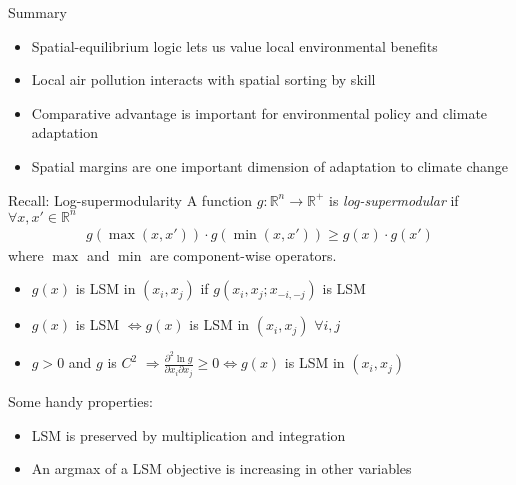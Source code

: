 \documentclass[11pt,notes=hide,aspectratio=169]{beamer}
\begin{document}
\begin{frame}{Summary}
\begin{itemize}
\item Spatial-equilibrium logic lets us value local environmental benefits
\item Local air pollution interacts with spatial sorting by skill
\item Comparative advantage is important for environmental policy and climate adaptation
\item Spatial margins are one important dimension of adaptation to climate change 
\end{itemize}
\vspace{1cm}
\end{frame}
\appendix
\begin{frame}{Recall: Log-supermodularity}
\hypertarget{appendix:LSM}{}
A function $g:\mathbb{R}^n\to\mathbb{R}^{+}$ is \emph{log-supermodular} if $\forall x,x'\in\mathbb{R}^n$
\begin{align*}
g\left(\max\left(x,x'\right)\right)\cdot g\left(\min\left(x,x'\right)\right)\geq g(x)\cdot g(x')
\end{align*}
where $\max$ and $\min$ are component-wise operators.
\begin{itemize}
	\item $g(x)$ is LSM in $(x_i,x_j)$ if $g(x_i,x_j;x_{-i,-j})$ is LSM 
	\item $g(x)$ is LSM $\iff g(x)$ is LSM in $(x_i,x_j)$  $\forall i,j$
	\item $g>0$ and $g$ is $C^2$ $\Rightarrow \frac{\partial^2 \ln g}{\partial x_i \partial x_j}\geq 0 \iff g(x)$ is LSM in $(x_i,x_j)$
\end{itemize}
Some handy properties:
\begin{itemize}
	\item LSM is preserved by multiplication and integration
	\item An argmax of a LSM objective is increasing in other variables
\end{itemize}
\hyperlink{institutionalsourcesofCA}{\beamerreturnbutton}
\end{frame}
\end{document}
